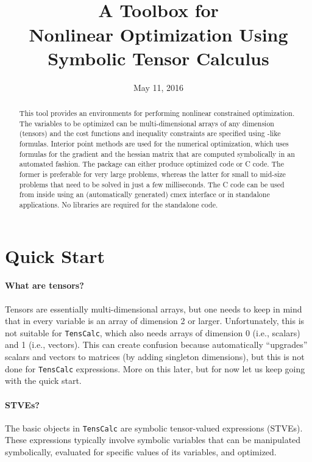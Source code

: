 \documentclass[11pt]{article}
\title{\sc \TC \\[1em]\Large A \matlab{} Toolbox for \\
  Nonlinear Optimization Using Symbolic Tensor Calculus}
\author{\jph}
\date{May 11, 2016}
\newcommand{\TC}{\texttt{TensCalc}}
\theoremstyle{remark}
\begin{document}
                        \maketitle

\begin{abstract}
  This tool provides an environments for performing nonlinear
  constrained optimization. The variables to be optimized can be
  multi-dimensional arrays of any dimension (tensors) and the cost
  functions and inequality constraints are specified using
  \matlab-like formulas. Interior point methods are used for the
  numerical optimization, which uses formulas for the gradient and the
  hessian matrix that are computed symbolically in an automated
  fashion.  The package can either produce optimized \matlab{} code or
  C code. The former is preferable for very large problems, whereas
  the latter for small to mid-size problems that need to be solved in
  just a few milliseconds. The C code can be used from inside
  \matlab{} using an (automatically generated) cmex interface or in
  standalone applications. No libraries are required for the
  standalone code.
\end{abstract}

\newpage

\tableofcontents

\newpage

\section{Quick Start}

\paragraph{What are tensors?} Tensors are essentially multi-dimensional arrays,
but one needs to keep in mind that in \matlab{} every variable is an
array of dimension 2 or larger. Unfortunately, this is not suitable
for \TC{}, which also needs arrays of dimension 0 (i.e., scalars) and
1 (i.e., vectors). This can create confusion because \matlab{}
automatically ``upgrades'' scalars and vectors to matrices (by adding
singleton dimensions), but this is not done for \TC{}
expressions. More on this later, but for now let us keep going with
the quick start.

\paragraph{STVEs?} The basic objects in \TC{} are symbolic
tensor-valued expressions (STVEs). These expressions typically involve
symbolic variables that can be manipulated symbolically, evaluated for
specific values of its variables, and optimized.
\end{document}
